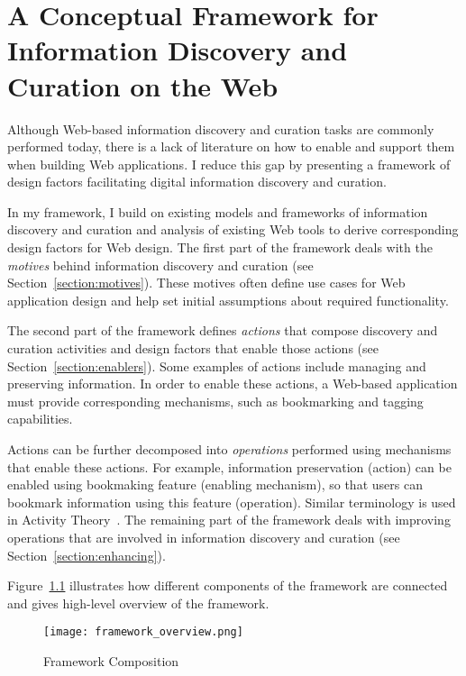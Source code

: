 \chapter{A Conceptual Framework for Information Discovery and Curation on the Web}
\label{chapter:framework}

Although Web-based information discovery and curation tasks are commonly performed today, there is a lack of literature on how to enable and support them when building Web applications. I reduce this gap by presenting a framework of design factors facilitating digital information discovery and curation. 

In my framework, I build on existing models and frameworks of information discovery and curation and analysis of existing Web tools to derive corresponding design factors for Web design. The first part of the framework deals with the \textit{motives} behind information discovery and curation (see Section~\ref{section:motives}). These motives often define use cases for Web application design and help set initial assumptions about required functionality.

The second part of the framework defines \textit{actions} that compose discovery and curation activities and design factors that enable those actions (see Section~\ref{section:enablers}). Some examples of actions include managing and preserving information. In order to enable these actions, a Web-based application must provide corresponding mechanisms, such as bookmarking and tagging capabilities.

\pagebreak
Actions can be further decomposed into \textit{operations} performed using mechanisms that enable these actions. For example, information preservation (action) can be enabled using bookmaking feature (enabling mechanism), so that users can bookmark information using this feature (operation). Similar terminology is used in Activity Theory~\cite{kuutti1996activity}. The remaining part of the framework deals with improving operations that are involved in information discovery and curation (see Section~\ref{section:enhancing}).  

Figure~\ref{fig:framework_overview} illustrates how different components of the framework are connected and gives high-level overview of the framework. 

\begin{figure}[ht!]
	\noindent
	\centering
	\texttt{[image: framework\_overview.png]}
	\caption{Framework Composition}
	\label{fig:framework_overview} 
\end{figure}
\clearpage

